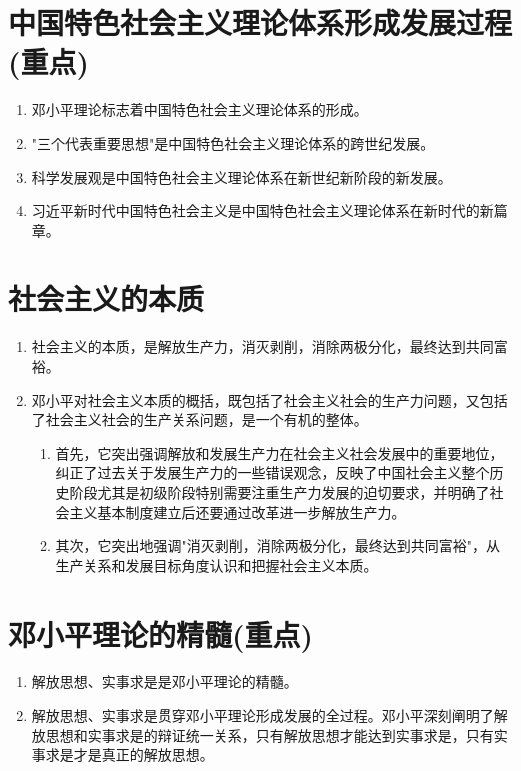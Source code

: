 \documentclass[12pt, a4paper, oneside]{ctexbook}
\begin{document}
\section{中国特色社会主义理论体系形成发展过程(重点)}

\begin{enumerate}[label=（\arabic*）]
\item 邓小平理论标志着中国特色社会主义理论体系的形成。

\item "三个代表重要思想"是中国特色社会主义理论体系的跨世纪发展。

\item 科学发展观是中国特色社会主义理论体系在新世纪新阶段的新发展。

\item 习近平新时代中国特色社会主义是中国特色社会主义理论体系在新时代的新篇章。
\end{enumerate}

\section{社会主义的本质}

\begin{enumerate}[label=（\arabic*）]
\item 社会主义的本质，是解放生产力，消灭剥削，消除两极分化，最终达到共同富裕。

\item 邓小平对社会主义本质的概括，既包括了社会主义社会的生产力问题，又包括了社会主义社会的生产关系问题，是一个有机的整体。

\begin{enumerate}[label=（\roman*）]
\item 首先，它突出强调解放和发展生产力在社会主义社会发展中的重要地位，纠正了过去关于发展生产力的一些错误观念，反映了中国社会主义整个历史阶段尤其是初级阶段特别需要注重生产力发展的迫切要求，并明确了社会主义基本制度建立后还要通过改革进一步解放生产力。

\item 其次，它突出地强调"消灭剥削，消除两极分化，最终达到共同富裕"，从生产关系和发展目标角度认识和把握社会主义本质。
\end{enumerate}
\end{enumerate}

\section{邓小平理论的精髓(重点)}

\begin{enumerate}[label=（\arabic*）]
\item 解放思想、实事求是是邓小平理论的精髓。

\item 解放思想、实事求是贯穿邓小平理论形成发展的全过程。邓小平深刻阐明了解放思想和实事求是的辩证统一关系，只有解放思想才能达到实事求是，只有实事求是才是真正的解放思想。
\end{enumerate}
\end{document}
